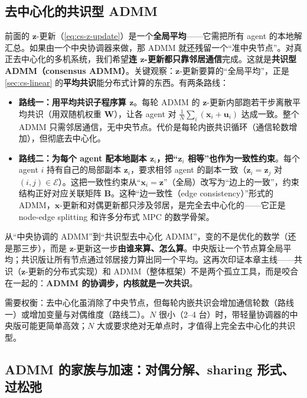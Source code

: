 \subsection{去中心化的共识型 ADMM}
\label{sec:cs-admm-decentral}

前面的 $\mathbf{z}$-更新（\cref{eq:cs-z-update}）是一个\textbf{全局平均}——它需把所有 agent 的本地解汇总。如果由一个中央协调器来做，那 ADMM 就还残留一个“准中央节点”。对真正去中心化的多机系统，我们希望\textbf{连 $\mathbf{z}$-更新都只靠邻居通信}完成。这就是\textbf{共识型 ADMM（consensus ADMM）}。关键观察：$\mathbf{z}$-更新要算的“全局平均”，正是 \cref{sec:cs-linear} 的\textbf{平均共识}能分布式计算的东西。有两条路线：
\begin{itemize}
  \item \textbf{路线一：用平均共识子程序算 $\mathbf{z}$}。每轮 ADMM 的 $\mathbf{z}$-更新内部跑若干步离散平均共识（用双随机权重 $\mathbf{W}$），让各 agent 对 $\tfrac1N\sum_i(\mathbf{x}_i+\mathbf{u}_i)$ 达成一致。整个 ADMM 只需邻居通信，无中央节点。代价是每轮内嵌共识循环（通信轮数增加），但彻底去中心化。
  \item \textbf{路线二：为每个 agent 配本地副本 $\mathbf{z}_i$，把“$\mathbf{z}_i$ 相等”也作为一致性约束}。每个 agent $i$ 持有自己的局部副本 $\mathbf{z}_i$，要求相邻 agent 的副本一致（$\mathbf{z}_i=\mathbf{z}_j$ 对 $(i,j)\in\mathcal{E}$）。这把一致性约束从“$\mathbf{x}_i=\mathbf{z}$”（全局）改写为“边上的一致”，约束结构正好对应关联矩阵 $\mathbf{B}$。这种“边一致性（edge consistency）”形式的 ADMM，$\mathbf{x}$-更新和对偶更新都只涉及邻居，是完全去中心化的——它正是 node-edge splitting 和许多分布式 MPC 的数学骨架。
\end{itemize}

\begin{insight}\label{ins:cs-admm-consensus}
从“中央协调的 ADMM”到“共识型去中心化 ADMM”，变的不是优化的数学（还是那三步），而是 $\mathbf{z}$-更新这一步\textbf{由谁来算、怎么算}。中央版让一个节点算全局平均；共识版让所有节点通过邻居接力算出同一个平均。这再次印证本章主线——共识（$\mathbf{z}$-更新的分布式实现）和 ADMM（整体框架）不是两个孤立工具，而是咬合在一起的：\textbf{ADMM 的协调步，内核就是一次共识}。
\end{insight}

需要权衡：去中心化虽消除了中央节点，但每轮内嵌共识会增加通信轮数（路线一）或增加变量与对偶维度（路线二）。$N$ 很小（2--4 台）时，带轻量协调器的中央版可能更简单高效；$N$ 大或要求绝对无单点时，才值得上完全去中心化的共识型。

\subsection{ADMM 的家族与加速：对偶分解、sharing 形式、过松弛}
\label{sec:cs-admm-family}

